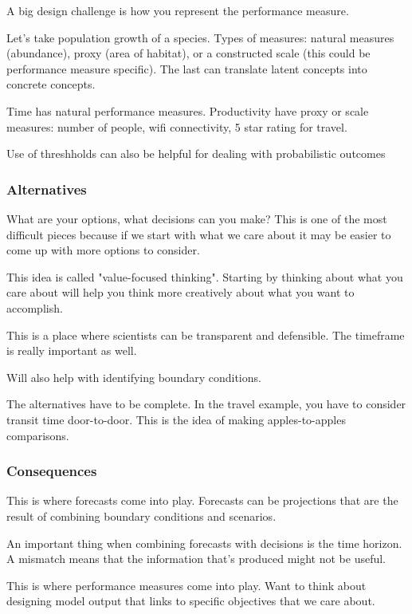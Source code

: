 \documentclass[12pt, oneside]{article}   	%
\begin{document}
A big design challenge is how you represent the performance measure.

Let's take population growth of a species. Types of measures: natural measures (abundance), proxy (area of habitat), or a constructed scale (this could be performance measure specific). The last can translate latent concepts into concrete concepts. 

Time has natural performance measures. Productivity have proxy or scale measures: number of people, wifi connectivity, 5 star rating for travel.

Use of threshholds can also be helpful for dealing with probabilistic outcomes

\subsubsection{Alternatives}

What are your options, what decisions can you make? This is one of the most difficult pieces because if we start with what we care about it may be easier to come up with more options to consider.

This idea is called "value-focused thinking". Starting by thinking about what you care about will help you think more creatively about what you want to accomplish.

This is a place where scientists can be transparent and defensible. The timeframe is really important as well.

Will also help with identifying boundary conditions.

The alternatives have to be complete. In the travel example, you have to consider transit time door-to-door. This is the idea of making apples-to-apples comparisons.

\subsubsection{Consequences}

This is where forecasts come into play. Forecasts can be projections that are the result of combining boundary conditions and scenarios.

An important thing when combining forecasts with decisions is the time horizon. A mismatch means that the information that's produced might not be useful.

This is where performance measures come into play. Want to think about designing model output that links to specific objectives that we care about.
\end{document}
